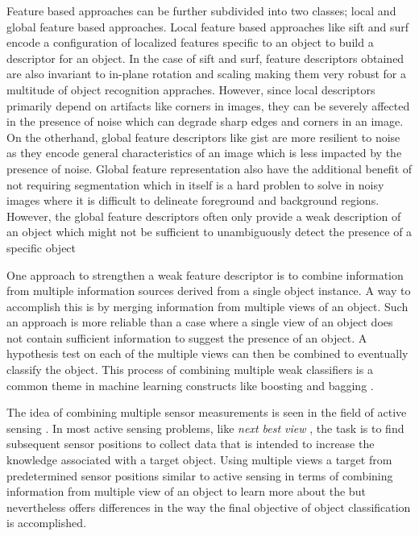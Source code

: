 \documentclass {udthesis}
\begin{document}
Feature based approaches can be further subdivided into two classes; local and global feature based approaches. Local feature based approaches like \gls{sift} \cite{sift} and \gls{surf} \cite{surf} encode a configuration of localized features specific to an object to build a descriptor for an object. In the case of \gls{sift} and \gls{surf}, feature descriptors obtained are also invariant to in-plane rotation and scaling making them very robust for a multitude of object recognition appraches. However, since local descriptors primarily depend on artifacts like corners in images, they can be severely affected in the presence of noise which can degrade sharp edges and corners in an image. On the otherhand, global feature descriptors like gist \cite{gist} are more resilient to noise as they encode general characteristics of an image which is less impacted by the presence of noise. Global feature representation also have the additional benefit of not requiring segmentation which in itself is a hard problen to solve in noisy images where it is difficult to delineate foreground and background regions. However, the global feature descriptors often only provide a weak description of an object which might not be sufficient to unambiguously detect the presence of a specific object

One approach to strengthen a weak feature descriptor is to combine information from multiple information sources derived from a single object instance. A way to accomplish this is by merging information from multiple views of an object. Such an approach is more reliable than a case where a single view of an object does not contain sufficient information to suggest the presence of an object. A hypothesis test on each of the multiple views can then be combined to eventually classify the object. This process of combining multiple weak classifiers is a common theme in machine learning constructs like boosting and bagging \cite{alpaydin}.

The idea of combining multiple sensor measurements is seen in the field of active sensing \cite{chen}. In most active sensing problems, like \emph{next best view} \cite{roy,dunn}, the task is to find subsequent sensor positions to collect data that is intended to increase the knowledge associated with a target object. Using multiple views a target from predetermined sensor positions similar to active sensing in terms of combining information from multiple view of an object to learn more about the but nevertheless offers differences in the way the final objective of object classification is accomplished.
\end{document}
